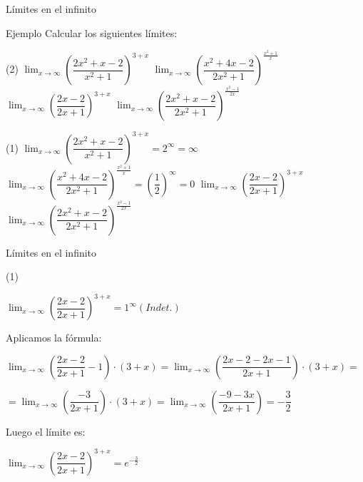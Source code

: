 \documentclass[8pt,handout]{beamer}
\newcommand{\limite}[2]{\displaystyle \lim_{x \rightarrow #1}{#2}}
\begin{document}
\begin{frame}{Límites en el infinito}
\begin{exampleblock}{Ejemplo}
Calcular los siguientes límites:
\begin{tasks}[label=\alph*)](2)
\task $\limite{\infty}{\left( \dfrac{2x^2+x-2}{x^2+1}\right)^{3+x}}$
\task $\limite{\infty}{\left( \dfrac{x^2+4x-2}{2x^2+1}\right)^{\frac{x^2+1}{x}}}$
\task $\limite{\infty}{\left( \dfrac{2x-2}{2x+1}\right)^{3+x}}$
\task $\limite{\infty}{\left( \dfrac{2x^2+x-2}{2x^2+1}\right)^{\frac{x^2-1}{2x}}}$
\end{tasks}
\end{exampleblock}

\begin{tasks}[label=\alph*)](1)
\task $\limite{\infty}{\left( \dfrac{2x^2+x-2}{x^2+1}\right)^{3+x}}=2^{\infty}=\infty$
\task $\limite{\infty}{\left( \dfrac{x^2+4x-2}{2x^2+1}\right)^{\frac{x^2+1}{x}}}=\left( \dfrac{1}{2}\right)^{\infty}=0$
\task $\limite{\infty}{\left( \dfrac{2x-2}{2x+1}\right)^{3+x}}$
\task $\limite{\infty}{\left( \dfrac{2x^2+x-2}{2x^2+1}\right)^{\frac{x^2-1}{2x}}}$
\end{tasks}
\end{frame}

\begin{frame}{Límites en el infinito}

\begin{tasks}[label=\alph*),resume](1)

\task $\limite{\infty}{\left( \dfrac{2x-2}{2x+1}\right)^{3+x}}=1^{\infty} (Indet.)$

\vspace{10pt}

Aplicamos la fórmula:

\vspace{10pt}

$\limite{\infty}{\left( \dfrac{2x-2}{2x+1}-1\right)\cdot(3+x)}= 
\limite{\infty}{\left( \dfrac{2x-2-2x-1}{2x+1}\right)\cdot(3+x)}= $

\vspace{10pt}

$= \limite{\infty}{\left( \dfrac{-3}{2x+1}\right)\cdot(3+x)}=
\limite{\infty}{\left( \dfrac{-9-3x}{2x+1}\right)}= -\dfrac{3}{2}$

\vspace{10pt}

Luego el límite es: 

\vspace{10pt}
$\limite{\infty}{\left( \dfrac{2x-2}{2x+1}\right)^{3+x}}= e^{-\frac{3}{2}}$


\end{tasks}
\end{frame}
\end{document}
